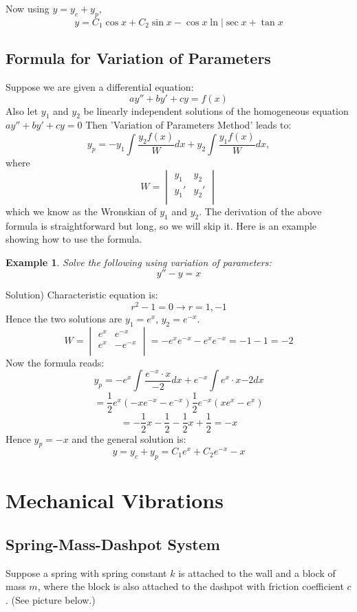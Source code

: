 \documentclass[12pt]{report}
\newtheorem{ex}{Example}[section]
\begin{document}
Now using $y= y_c + y_p$,
$$y = C_1 \cos x + C_2 \sin x - \cos x  \ln |\sec x + \tan x $$


\subsection*{Formula for Variation of Parameters}

Suppose we are given a differential equation:
$$ a y'' +  b y' + cy = f(x) $$
Also let $y_1$ and $y_2$ be linearly independent solutions of the homogeneous equation $ a y'' +  b y' + cy = 0 $
Then 'Variation of Parameters Method' leads to:
$$y_p = -y_1 \int \frac{y_2 f(x)}{W} dx + y_2 \int \frac{y_1 f(x)}{W} dx,$$
where
$$W = \begin{vmatrix} y_1  & y_2 \\ y_1'  & y_2' \\ \end{vmatrix}$$
which we know as the Wronskian of $y_1$ and $y_2$. The derivation of the above formula is straightforward but long, so we will skip it. Here is an example showing how to use the formula.

\begin{ex}
	Solve the following using variation of parameters:
$$y'' - y =x$$
\end{ex}
Solution) Characteristic equation is:
$$r^2 -1 =0 \rightarrow r=1, -1$$
Hence the two solutions are $y_1 = e^x$, $y_2=e^{-x}$.
$$W = \begin{vmatrix} e^x  & e^{-x} \\ e^x  & -e^{-x} \\ \end{vmatrix} = -e^x e^{-x} - e^x e^{-x} = -1 -1 =-2$$
Now the formula reads:
$$y_p = -e^x \int \frac{e^{-x} \cdot x }{-2} dx + e^{-x} \int {e^x \cdot x }{-2} dx$$
$$= \frac{1}{2} e^x (-xe^{-x} -e^{-x})  \frac{1}{2} e^{-x} (xe^{x} -e^{x})$$
$$= - \frac{1}{2} x -\frac{1}{2}- \frac{1}{2} x +\frac{1}{2} = -x$$
Hence $y_p = -x$ and the general solution is:
$$y=y_c + y_p = C_1 e^x + C_2 e^{-x} - x$$

\section{Mechanical Vibrations}

\subsection*{Spring-Mass-Dashpot System}
Suppose a spring with spring constant $k$ is attached to the wall and a block of mass $m$, where the block is also attached to the dashpot with friction coefficient $c$. (See picture below.)
\begin{center}
\end{center}
\end{document}
